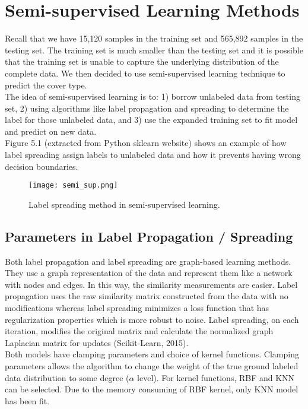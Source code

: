 \documentclass[11pt]{article}
\begin{document}
\section{Semi-supervised Learning Methods}
Recall that we have 15,120 samples in the training set and 565,892 samples in the testing set. The training set is much smaller than the testing set and it is possible that the training set is unable to capture the underlying distribution of the complete data. We then decided to use semi-supervised learning technique to predict the cover type.\\

\noindent The idea of semi-supervised learning is to: 1) borrow unlabeled data from testing set, 2) using algorithms like label propagation and spreading to determine the label for those unlabeled data, and 3) use the expanded training set to fit model and predict on new data. \\

\noindent Figure 5.1 (extracted from Python sklearn website) shows an example of how label spreading assign labels to unlabeled data and how it prevents having wrong decision boundaries. \\

\begin{figure}[ht]
\label{label_spreading}
\begin{center}
\texttt{[image: semi\_sup.png]}
\end{center}
\caption{Label spreading method in semi-supervised learning.}
\end{figure}

\subsection{Parameters in Label Propagation / Spreading}
Both label propagation and label spreading are graph-based learning methods. They use a graph representation of the data and represent them like a network with nodes and edges. In this way, the similarity measurements are easier. Label propagation uses the raw similarity matrix constructed from the data with no modifications whereas label spreading minimizes a loss function that has regularization properties which is more robust to noise. Label spreading, on each iteration, modifies the original matrix and calculate the normalized graph Laplacian matrix for updates (Scikit-Learn, 2015). \\

\noindent Both models have clamping parameters and choice of kernel functions. Clamping parameters allows the algorithm to change the weight of the true ground labeled data distribution to some degree ($\alpha$ level). For kernel functions, RBF and KNN can be selected. Due to the memory consuming of RBF kernel, only KNN model has been fit. \\
\end{document}
